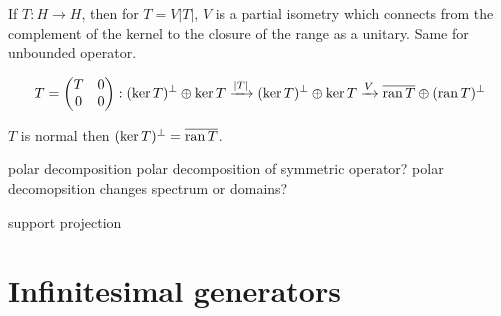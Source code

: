 \documentclass{../../large}
\begin{document}
\begin{prb}
If $T:H\to H$, then for $T=V|T|$, $V$ is a partial isometry which connects from the complement of the kernel to the closure of the range as a unitary.
Same for unbounded operator.

\[T=\begin{pmatrix}T&0\\0&0\end{pmatrix}:(\ker T)^\perp\oplus\ker T\xrightarrow{|T|}(\ker T)^\perp\oplus\ker T\xrightarrow{V}\overline{\operatorname{ran} T}\oplus(\operatorname{ran} T)^\perp\]


$T$ is normal then $(\ker T)^\perp=\overline{\operatorname{ran} T}$.


polar decomposition
polar decomposition of symmetric operator?
polar decomopsition changes spectrum or domains?

support projection
\end{prb}


\section{Infinitesimal generators}
\end{document}
